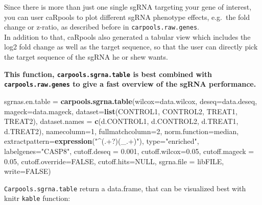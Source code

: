 \documentclass[]{article}
\newenvironment{Shaded}{\begin{snugshade}}{\end{snugshade}}
\newcommand{\KeywordTok}[1]{\textcolor[rgb]{0.13,0.29,0.53}{\textbf{{#1}}}}
\newcommand{\DataTypeTok}[1]{\textcolor[rgb]{0.13,0.29,0.53}{{#1}}}
\newcommand{\DecValTok}[1]{\textcolor[rgb]{0.00,0.00,0.81}{{#1}}}
\newcommand{\FloatTok}[1]{\textcolor[rgb]{0.00,0.00,0.81}{{#1}}}
\newcommand{\StringTok}[1]{\textcolor[rgb]{0.31,0.60,0.02}{{#1}}}
\newcommand{\OtherTok}[1]{\textcolor[rgb]{0.56,0.35,0.01}{{#1}}}
\newcommand{\NormalTok}[1]{{#1}}
\begin{document}
Since there is more than just one single sgRNA targeting your gene of
interest, you can user caRpools to plot different sgRNA phenotype
effects, e.g.~the fold change or z-ratio, as described before in
\texttt{carpools.raw.genes}.\\
In addition to that, caRpools also generated a tabular view which
includes the log2 fold change as well as the target sequence, so that
the user can directly pick the target sequence of the sgRNA he or shew
wants.

\textbf{This function, \texttt{carpools.sgrna.table} is best combined
with \texttt{carpools.raw.genes} to give a fast overview of the sgRNA
performance.}

\begin{Shaded}
\begin{Highlighting}[]
\NormalTok{sgrnas.en.table =}\StringTok{ }\KeywordTok{carpools.sgrna.table}\NormalTok{(}\DataTypeTok{wilcox=}\NormalTok{data.wilcox, }\DataTypeTok{deseq=}\NormalTok{data.deseq,}
    \DataTypeTok{mageck=}\NormalTok{data.mageck, }\DataTypeTok{dataset=}\KeywordTok{list}\NormalTok{(CONTROL1, CONTROL2, TREAT1, TREAT2),}
    \DataTypeTok{dataset.names =} \KeywordTok{c}\NormalTok{(d.CONTROL1, d.CONTROL2, d.TREAT1, d.TREAT2), }\DataTypeTok{namecolumn=}\DecValTok{1}\NormalTok{,}
    \DataTypeTok{fullmatchcolumn=}\DecValTok{2}\NormalTok{, }\DataTypeTok{norm.function=}\NormalTok{median, }\DataTypeTok{extractpattern=}\KeywordTok{expression}\NormalTok{(}\StringTok{"^(.+?)(_.+)"}\NormalTok{),}
    \DataTypeTok{type=}\StringTok{"enriched"}\NormalTok{, }\DataTypeTok{labelgenes=}\StringTok{"CASP8"}\NormalTok{, }\DataTypeTok{cutoff.deseq =} \FloatTok{0.001}\NormalTok{, }\DataTypeTok{cutoff.wilcox=}\FloatTok{0.05}\NormalTok{,}
    \DataTypeTok{cutoff.mageck =} \FloatTok{0.05}\NormalTok{, }\DataTypeTok{cutoff.override=}\OtherTok{FALSE}\NormalTok{, }\DataTypeTok{cutoff.hits=}\OtherTok{NULL}\NormalTok{, }\DataTypeTok{sgrna.file =} \NormalTok{libFILE,}
    \DataTypeTok{write=}\OtherTok{FALSE}\NormalTok{)}
\end{Highlighting}
\end{Shaded}

\texttt{Carpools.sgrna.table} return a data.frame, that can be
visualized best with knitr \texttt{kable} function:
\end{document}
